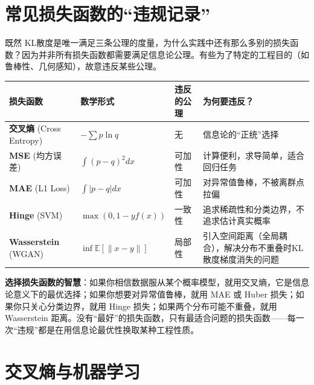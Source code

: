 \section{常见损失函数的“违规记录”}

既然 KL散度是唯一满足三条公理的度量，为什么实践中还有那么多别的损失函数？因为并非所有损失函数都需要满足信息论公理。有些为了特定的工程目的（如鲁棒性、几何感知），故意违反某些公理。

\begin{center}
\renewcommand{\arraystretch}{1.6}
\begin{tabularx}{\textwidth}{p{2.4cm}|p{2.8cm}|p{2cm}|X}
\toprule
\textbf{损失函数} & \textbf{数学形式} & \textbf{违反的公理} & \textbf{为何要违反？} \\
\midrule
\textbf{交叉熵} (Cross Entropy) 
& $-\sum p \ln q$ 
& 无 
& 信息论的“正统”选择 \\
\midrule
\textbf{MSE} (均方误差) 
& $\int (p-q)^2 dx$ 
& 可加性 
& 计算便利，求导简单，适合回归任务 \\
\midrule
\textbf{MAE} (L1 Loss) 
& $\int |p-q| dx$ 
& 可加性 
& 对异常值鲁棒，不被离群点拉偏 \\
\midrule
\textbf{Hinge} (SVM) 
& $\max(0, 1-yf(x))$ 
& 一致性 
& 追求稀疏性和分类边界，不追求估计真实概率 \\
\midrule
\textbf{Wasserstein} (WGAN) 
& $\inf \mathbb{E}[\|x-y\|]$ 
& 局部性 
& 引入空间距离（全局耦合），解决分布不重叠时KL散度梯度消失的问题 \\
\bottomrule
\end{tabularx}
\end{center}

\begin{physicalmeaning}
\textbf{选择损失函数的智慧}：如果你相信数据服从某个概率模型，就用交叉熵，它是信息论意义下的最优选择；如果你想要对异常值鲁棒，就用 MAE 或 Huber 损失；如果你只关心分类边界，就用 Hinge 损失；如果两个分布可能不重叠，就用 Wasserstein 距离。没有“最好”的损失函数，只有最适合问题的损失函数——每一次“违规”都是在用信息论最优性换取某种工程性质。
\end{physicalmeaning}


\section{交叉熵与机器学习}

